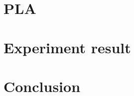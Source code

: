 \documentclass[twocolumn,10pt]{article}
\begin{document}
\section{PLA}

\section{Experiment result}

\section{Conclusion}



\end{document}

